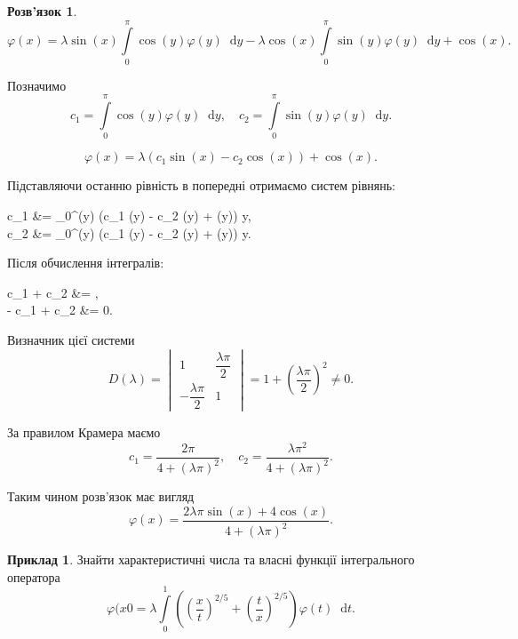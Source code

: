 \documentclass[a4paper, 12pt]{book}
\theoremstyle{definition}
\newtheorem{example}{Приклад}
\newtheorem*{solution*}{Розв'язок}
\newcommand*\diff{\mathop{}\!\mathrm{d}}
\renewcommand{\phi}{\varphi}
\newcommand{\Int}{\displaystyle\int\limits}
\newenvironment{system*}{\begin{equation*} \left\{\begin{aligned}}{\end{aligned} \right. \end{equation*}}
\begin{document}
\begin{solution*}
	\[ \phi(x) = \lambda \sin(x) \Int_0^\pi \cos(y) \phi(y) \diff y - \lambda \cos(x) \Int_0^\pi \sin(y) \phi(y) \diff y + \cos(x). \]

	Позначимо \[ c_1 = \Int_0^\pi \cos(y) \phi(y) \diff y, \quad c_2 = \Int_0^\pi \sin(y) \phi(y) \diff y. \]

	\[ \phi(x) = \lambda (c_1 \sin(x) - c_2 \cos(x)) + \cos(x). \]
	
	Підставляючи останню рівність в попередні отримаємо систем рівнянь:
	\begin{system*}
		c_1 &= \Int_0^\pi \cos(y) (\lambda c_1 \sin(y) - \lambda c_2 \cos(y) + \cos(y)) \diff y, \\
		c_2 &= \Int_0^\pi \sin(y) (\lambda c_1 \sin(y) - \lambda c_2 \cos(y) + \cos(y)) \diff y.
	\end{system*}
	
	Після обчислення інтегралів:
	\begin{system*}
		c_1 +  c_2 &= \dfrac{\pi}{2}, \\
		-  c_1 + c_2 &= 0.
	\end{system*}

	Визначник цієї системи
	\[ D(\lambda) = \begin{vmatrix} 1 & \dfrac{\lambda\pi}{2} \\ -\dfrac{\lambda\pi}{2} & 1 \end{vmatrix} = 1 + \left( \dfrac{\lambda \pi}{2} \right)^2 \ne 0. \]
	
	За правилом Крамера маємо
	\[ c_1 = \dfrac{2 \pi}{4 + (\lambda \pi)^2}, \quad c_2 = \dfrac{\lambda \pi^2}{4 + (\lambda \pi)^2}. \]
	
	Таким чином розв’язок має вигляд
	\[ \phi(x) = \dfrac{2 \lambda \pi \sin(x) + 4 \cos (x)}{4 + (\lambda \pi)^2}. \]
\end{solution*}

\newpage

\begin{example}
	Знайти характеристичні числа та власні функції інтегрального оператора \[ \phi(x0 = \lambda \Int_0^1 \left( \left( \dfrac{x}{t} \right)^{2/5} + \left( \dfrac{t}{x} \right)^{2/5} \right) \phi(t) \diff t. \]
\end{example}
\end{document}
